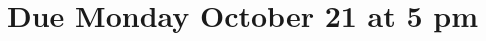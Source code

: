 \documentclass[11pt,fleqn]{article}
\begin{document}
\maketitle
\section*{Due Monday October 21 at 5 pm}










\end{document}
